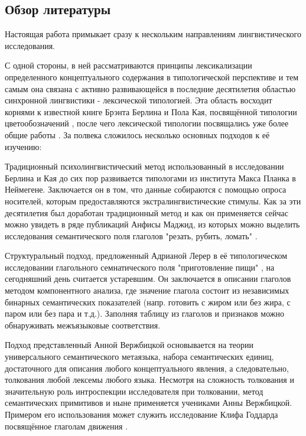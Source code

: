 \subsection{Обзор литературы}
Настоящая работа примыкает сразу к нескольким направлениям лингвистического исследования. 

С одной стороны, в ней рассматриваются принципы лексикализации определенного концептуального содержания в типологической перспективе и тем самым она связана с активно развивающейся в последние десятилетия областью синхронной лингвистики - лексической типологией. Эта область восходит корнями к известной книге Брэнта Берлина и Пола Кая, посвящённой типологии цветообозначений \citep{berlin1969basic}, после чего лексической типологии посвящались уже более общие работы \citep{lehmann1990towards, koptjevskaja2008approaching, krv2015}. За полвека сложилось несколько основных подходов к её изучению:  \begin{enumerate*}[itemjoin={\hskip3mm},after=\hskip3mm,before=\hskip3mm]
    \item Традиционный психолингвистический метод использованный в исследовании Берлина и Кая до сих пор развивается типологами из института Макса Планка в Неймегене. Заключается он в том, что данные собираются с помощью опроса носителей, которым предоставляются экстралингвистические стимулы. Как за эти десятилетия был доработан традиционный метод и как он применяется сейчас можно увидеть в ряде публикаций Анфисы Маджид, из которых можно выделить исследования семантического поля глаголов "резать, рубить, ломать" \citep{majid2007semantic, majid2008cross}.
    \item Структуральный подход, предложенный Адрианой Лерер в её типологическом исследовании глагольного семнатического поля "приготовление пищи"  \citep{lehrer1969semantic}, на сегодняшний день считается устаревшим. Он заключается в описании глаголов методом компонентного анализа, где значение глагола состоит из независимых бинарных семантических показателей (напр. готовить с жиром или без жира, с паром или без пара и т.д.). Заполняя таблицу из глаголов и признаков можно обнаруживать межъязыковые соответствия.
    \item Подход представленный Анной Вержбицкой \citep{wierzbicka1972semantic, goddard1994semantic} основывается на теории универсального семантического метаязыка, набора семантических единиц, достаточного для описания любого концептуального явления, а следовательно, толкования любой лексемы любого языка. Несмотря на сложность толкования и значительную роль интроспекции исследователя при толковании, метод семантических примитивов и ныне применяется учениками Анны Вержбицкой. Примером его использования может служить исследование Клифа Годдарда посвящённое глаголам движения \citep{goddard1997semantics}.

\end{enumerate*}
